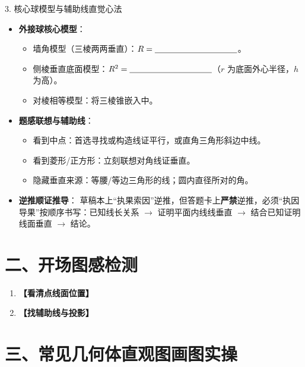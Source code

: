 \documentclass[11pt,a4paper]{ctexart}
\newcommand{\answerarea}[1]{\vspace{#1}}
\begin{document}
\begin{taskbox}{3. 核心球模型与辅助线直觉心法}
\begin{itemize}[leftmargin=1.5em, itemsep=0.8em]
  \item \textbf{外接球核心模型}：
  \begin{itemize}[leftmargin=1.5em, itemsep=0.3em]
    \item 墙角模型（三棱两两垂直）：$R = \blank{3.5cm}$。
    \item 侧棱垂直底面模型：$R^2 = \blank{3.5cm}$（$r$ 为底面外心半径，$h$ 为高）。
    \item 对棱相等模型：将三棱锥嵌入\blank{2.0cm}中。
  \end{itemize}
  \item \textbf{题感联想与辅助线}：
  \begin{itemize}[leftmargin=1.5em, itemsep=0.3em]
    \item 看到中点：首选寻找或构造\blank{2.5cm}线证平行，或直角三角形斜边中线。
    \item 看到菱形/正方形：立刻联想对角线\blank{2.5cm}证垂直。
    \item 隐藏垂直来源：等腰/等边三角形的\blank{2.0cm}线；圆内直径所对的\blank{2.0cm}角。
  \end{itemize}
  \item \textbf{逆推顺证推导}：
  草稿本上“执果索因”逆推，但答题卡上\textbf{严禁}逆推，必须“执因导果”按顺序书写：已知线长关系 $\rightarrow$ 证明平面内线线垂直 $\rightarrow$ 结合已知证明线面垂直 $\rightarrow$ 结论。
\end{itemize}
\end{taskbox}





\section*{二、开场图感检测}

\begin{enumerate}
  \item \textbf{【看清点线面位置】} 
  \qSolidOpeningCubeRelationsStem
  \answerarea{1.5cm}

  \item \textbf{【找辅助线与投影】}
  \qSolidOpeningPyramidProjectionStem
  \answerarea{1.5cm}
\end{enumerate}
\newpage

\section*{三、常见几何体直观图画图实操}
\end{document}
